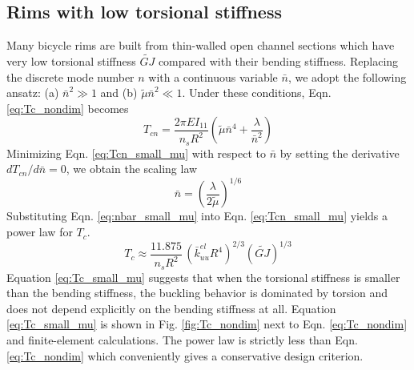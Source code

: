 \documentclass{bmd2016p}
\begin{document}
\subsection{Rims with low torsional stiffness}\label{sec:powerlaw_1}
Many bicycle rims are built from thin-walled open channel sections which have very low torsional stiffness $\widetilde{GJ}$ compared with their bending stiffness. Replacing the discrete mode number $n$ with a continuous variable $\bar{n}$, we adopt the following ansatz: (a) $\bar{n}^2 \gg 1$ and (b) $\tilde{\mu}\bar{n}^2 \ll 1$. Under these conditions, Eqn. \ref{eq:Tc_nondim} becomes
	\begin{equation}\label{eq:Tcn_small_mu}
	T_{cn} = \frac{2\pi EI_{11}}{n_sR^2} \left( \tilde{\mu}\bar{n}^4 + \frac{\lambda}{\bar{n}^2}\right)
	\end{equation}
Minimizing Eqn. \ref{eq:Tcn_small_mu} with respect to $\bar{n}$ by setting the derivative $dT_{cn}/d\bar{n}=0$, we obtain the scaling law
	\begin{equation}\label{eq:nbar_small_mu}
	\bar{n} = \left(\frac{\lambda}{2\tilde{\mu}} \right)^{1/6}
	\end{equation}
Substituting Eqn. \ref{eq:nbar_small_mu} into Eqn. \ref{eq:Tcn_small_mu} yields a power law for $T_c$.
	\begin{equation}\label{eq:Tc_small_mu}
	T_c \approx \frac{11.875}{n_sR^2} \, \left(\bar{k}_{uu}^{el}R^4 \right)^{2/3} (\widetilde{GJ})^{1/3}
	\end{equation}
Equation \ref{eq:Tc_small_mu} suggests that when the torsional stiffness is smaller than the bending stiffness, the buckling behavior is dominated by torsion and does not depend explicitly on the bending stiffness at all. Equation \ref{eq:Tc_small_mu} is shown in Fig. \ref{fig:Tc_nondim} next to Eqn. \ref{eq:Tc_nondim} and finite-element calculations. The power law is strictly less than Eqn. \ref{eq:Tc_nondim} which conveniently gives a conservative design criterion.
\end{document}
